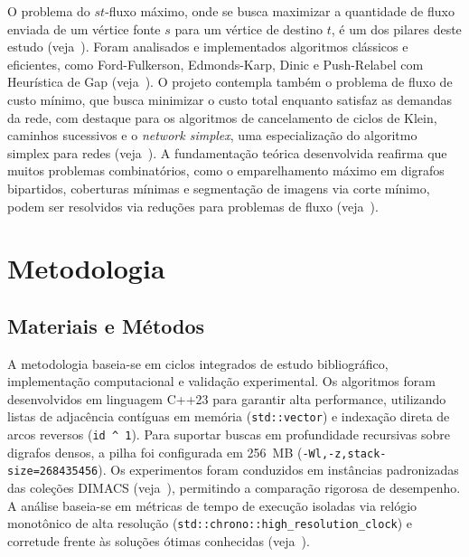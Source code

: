 \documentclass[12pt,a4paper]{article}
\begin{document}
O problema do $st$-fluxo máximo, onde se busca maximizar a quantidade de fluxo enviada de um vértice fonte $s$ para um vértice de destino $t$, é um dos pilares deste estudo (veja~\cite{ford1956maximal}). Foram analisados e implementados algoritmos clássicos e eficientes, como Ford-Fulkerson, Edmonds-Karp, Dinic e Push-Relabel com Heurística de Gap (veja~\cite{ford1956maximal, edmonds1972theoretical, dinic1970algorithm, goldberg1988new}).
O projeto contempla também o problema de fluxo de custo mínimo, que busca minimizar o custo total enquanto satisfaz as demandas da rede, com destaque para os algoritmos de cancelamento de ciclos de Klein, caminhos sucessivos e o \textit{network simplex}, uma especialização do algoritmo simplex para redes (veja~\cite{dantzig1951application, ahuja1993network}).
A fundamentação teórica desenvolvida reafirma que muitos problemas combinatórios, como o emparelhamento máximo em digrafos bipartidos, coberturas mínimas e segmentação de imagens via corte mínimo, podem ser resolvidos via reduções para problemas de fluxo (veja~\cite{ahuja1993network, boykov2001interactive}).

\clearpage

\section{Metodologia}\label{sec:metodologia}

\subsection{Materiais e Métodos}
A metodologia baseia-se em ciclos integrados de estudo bibliográfico, implementação computacional e validação experimental. Os algoritmos foram desenvolvidos em linguagem C++23 para garantir alta performance, utilizando listas de adjacência contíguas em memória (\lstinline{std::vector}) e indexação direta de arcos reversos (\lstinline{id ^ 1}). Para suportar buscas em profundidade recursivas sobre digrafos densos, a pilha foi configurada em 256~MB (\lstinline{-Wl,-z,stack-size=268435456}).
Os experimentos foram conduzidos em instâncias padronizadas das coleções DIMACS (veja~\cite{Jensen2022}), permitindo a comparação rigorosa de desempenho. A análise baseia-se em métricas de tempo de execução isoladas via relógio monotônico de alta resolução (\lstinline{std::chrono::high_resolution_clock}) e corretude frente às soluções ótimas conhecidas (veja~\cite{ford1956maximal}).
\end{document}
